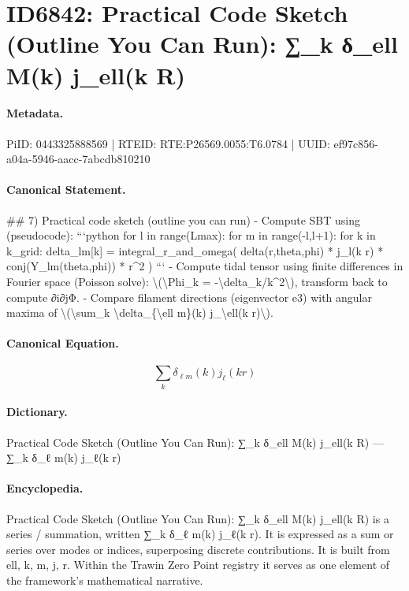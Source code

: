 \section*{ID6842: Practical Code Sketch (Outline You Can Run): ∑\_k δ\_ell M(k) j\_ell(k R)}
\paragraph{Metadata.}
PiID: 0443325888569 | RTEID: RTE:P26569.0055:T6.0784 | UUID: ef97c856-a04a-5946-aacc-7abcdb810210

\paragraph{Canonical Statement.}
\#\# 7) Practical code sketch (outline you can run) - Compute SBT using (pseudocode): ```python for l in range(Lmax): for m in range(-l,l+1): for k in k\_grid: delta\_lm[k] = integral\_r\_and\_omega( delta(r,theta,phi) * j\_l(k r) * conj(Y\_lm(theta,phi)) * r\textasciicircum{}2 ) ``` - Compute tidal tensor using finite differences in Fourier space (Poisson solve): \textbackslash{}(\textbackslash{}Phi\_k = -\textbackslash{}delta\_k/k\textasciicircum{}2\textbackslash{}), transform back to compute ∂i∂jΦ. - Compare filament directions (eigenvector e3) with angular maxima of \textbackslash{}(\textbackslash{}sum\_k \textbackslash{}delta\_\{\textbackslash{}ell m\}(k) j\_\textbackslash{}ell(k r)\textbackslash{}).

\paragraph{Canonical Equation.}
\[
\sum_k \delta_{\ell m}(k) j_\ell(k r)
\]

\paragraph{Dictionary.}
Practical Code Sketch (Outline You Can Run): ∑\_k δ\_ell M(k) j\_ell(k R) — ∑\_k δ\_ℓ m(k) j\_ℓ(k r)

\paragraph{Encyclopedia.}
Practical Code Sketch (Outline You Can Run): ∑\_k δ\_ell M(k) j\_ell(k R) is a series / summation, written ∑\_k δ\_ℓ m(k) j\_ℓ(k r). It is expressed as a sum or series over modes or indices, superposing discrete contributions. It is built from ell, k, m, j, r. Within the Trawin Zero Point registry it serves as one element of the framework's mathematical narrative.
